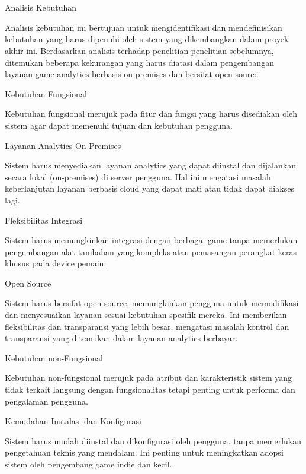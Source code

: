 \chapter{\babTiga}
\label{bab:3}
Analisis Kebutuhan

Analisis kebutuhan ini bertujuan untuk mengidentifikasi dan mendefinisikan kebutuhan yang harus dipenuhi oleh sistem yang dikembangkan dalam proyek akhir ini. Berdasarkan analisis terhadap penelitian-penelitian sebelumnya, ditemukan beberapa kekurangan yang harus diatasi dalam pengembangan layanan game analytics berbasis on-premises dan bersifat open source.

Kebutuhan Fungsional

Kebutuhan fungsional merujuk pada fitur dan fungsi yang harus disediakan oleh sistem agar dapat memenuhi tujuan dan kebutuhan pengguna.

Layanan Analytics On-Premises

Sistem harus menyediakan layanan analytics yang dapat diinstal dan dijalankan secara lokal (on-premises) di server pengguna. Hal ini mengatasi masalah keberlanjutan layanan berbasis cloud yang dapat mati atau tidak dapat diakses lagi.

Fleksibilitas Integrasi

Sistem harus memungkinkan integrasi dengan berbagai game tanpa memerlukan pengembangan alat tambahan yang kompleks atau pemasangan perangkat keras khusus pada device pemain.

Open Source

Sistem harus bersifat open source, memungkinkan pengguna untuk memodifikasi dan menyesuaikan layanan sesuai kebutuhan spesifik mereka. Ini memberikan fleksibilitas dan transparansi yang lebih besar, mengatasi masalah kontrol dan transparansi yang ditemukan dalam layanan analytics berbayar.

Kebutuhan non-Fungsional

Kebutuhan non-fungsional merujuk pada atribut dan karakteristik sistem yang tidak terkait langsung dengan fungsionalitas tetapi penting untuk performa dan pengalaman pengguna.

Kemudahan Instalasi dan Konfigurasi

Sistem harus mudah diinstal dan dikonfigurasi oleh pengguna, tanpa memerlukan pengetahuan teknis yang mendalam. Ini penting untuk meningkatkan adopsi sistem oleh pengembang game indie dan kecil.

